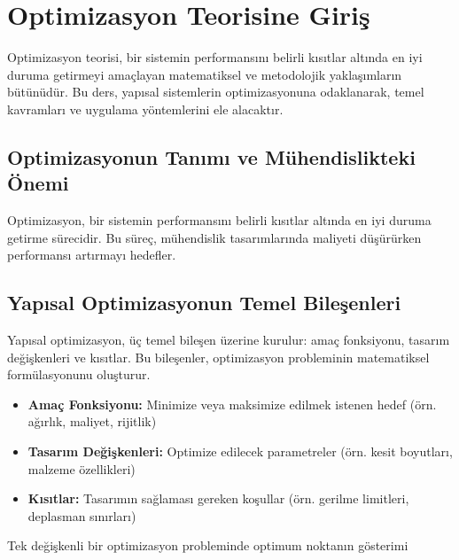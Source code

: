 \section{Optimizasyon Teorisine Giriş}
Optimizasyon teorisi, bir sistemin performansını belirli kısıtlar altında en iyi duruma getirmeyi amaçlayan matematiksel ve metodolojik yaklaşımların bütünüdür. Bu ders, yapısal sistemlerin optimizasyonuna odaklanarak, temel kavramları ve uygulama yöntemlerini ele alacaktır.

\subsection{Optimizasyonun Tanımı ve Mühendislikteki Önemi}
Optimizasyon, bir sistemin performansını belirli kısıtlar altında en iyi duruma getirme sürecidir.  Bu süreç, mühendislik tasarımlarında maliyeti düşürürken performansı artırmayı hedefler.


\subsection{Yapısal Optimizasyonun Temel Bileşenleri}
Yapısal optimizasyon, üç temel bileşen üzerine kurulur: amaç fonksiyonu, tasarım değişkenleri ve kısıtlar. Bu bileşenler, optimizasyon probleminin matematiksel formülasyonunu oluşturur.

\begin{itemize}
    \item \textbf{Amaç Fonksiyonu:} Minimize veya maksimize edilmek istenen hedef (örn. ağırlık, maliyet, rijitlik)
    \item \textbf{Tasarım Değişkenleri:} Optimize edilecek parametreler (örn. kesit boyutları, malzeme özellikleri)
    \item \textbf{Kısıtlar:} Tasarımın sağlaması gereken koşullar (örn. gerilme limitleri, deplasman sınırları)
\end{itemize}

\begin{marginfigure}
\centering
{}
\caption{Tek değişkenli bir optimizasyon probleminde optimum noktanın gösterimi}
\label{fig:single_var_opt}
\end{marginfigure}

